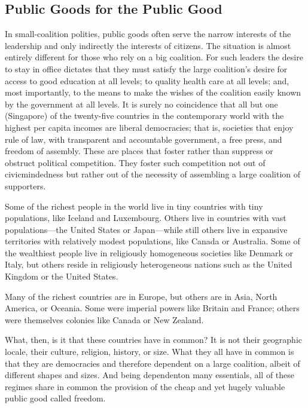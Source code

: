 \documentclass[10pt]{article}
\begin{document}
\subsection{Public Goods for the Public Good}

{\large In small-coalition polities, public goods often serve the narrow
interests of the leadership and only indirectly the interests of citizens. The
situation is almost entirely different for those who rely on a big coalition. For
such leaders the desire to stay in office dictates that they must satisfy the
large coalition's desire for access to good education at all levels; to quality
health care at all levels; and, most importantly, to the means to make the wishes
of the coalition easily known by the government at all levels. It is surely no
coincidence that all but one (Singapore) of the twenty-five countries in the
contemporary world with the highest per capita incomes are liberal democracies;
that is, societies that enjoy rule of law, with transparent and accountable
government, a free press, and freedom of assembly. These are places that foster
rather than suppress or obstruct political competition. They foster such
competition not out of civicmindedness but rather out of the necessity of
assembling a large coalition of supporters.}

{\large Some of the richest people in the world live in tiny countries with tiny
populations, like Iceland and Luxembourg. Others live in countries with vast
populations---the United States or Japan---while still others live in expansive
territories with relatively modest populations, like Canada or Australia. Some of
the wealthiest people live in religiously homogeneous societies like Denmark or
Italy, but others reside in religiously heterogeneous nations such as the United
Kingdom or the United States.}

{\large Many of the richest countries are in Europe, but others are in Asia,
North America, or Oceania. Some were imperial powers like Britain and France;
others were themselves colonies like Canada or New Zealand.}

{\large What, then, is it that these countries have in common? It is not their
geographic locale, their culture, religion, history, or size. What they all have
in common is that they are democracies and therefore dependent on a large
coalition, albeit of different shapes and sizes. And being dependenton many
essentials, all of these regimes share in common the provision of the cheap and
yet hugely valuable public good called freedom.}
\end{document}
